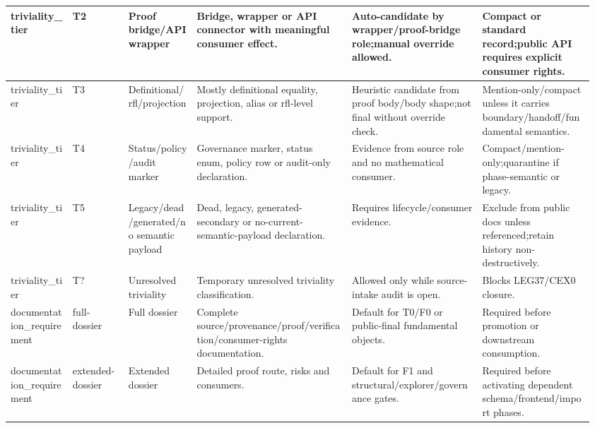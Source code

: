 \begin{longtable}{L{0.105\linewidth} L{0.095\linewidth} L{0.11\linewidth} L{0.255\linewidth} L{0.215\linewidth} L{0.185\linewidth}}
triviality\_tier & T2 & Proof bridge/\allowbreak{}API wrapper & Bridge, wrapper or API connector with meaningful consumer effect. & Auto-candidate by wrapper/\allowbreak{}proof-bridge role;\newline manual override allowed. & Compact or standard record;\newline public API requires explicit consumer rights.\\
\hline
\addlinespace[0.24em]
triviality\_tier & T3 & Definitional/\allowbreak{}rfl/\allowbreak{}projection & Mostly definitional equality, projection, alias or rfl-level support. & Heuristic candidate from proof body/\allowbreak{}body shape;\newline not final without override check. & Mention-only/\allowbreak{}compact unless it carries boundary/\allowbreak{}handoff/\allowbreak{}fundamental semantics.\\
\hline
\addlinespace[0.24em]
triviality\_tier & T4 & Status/\allowbreak{}policy/\allowbreak{}audit marker & Governance marker, status enum, policy row or audit-only declaration. & Evidence from source role and no mathematical consumer. & Compact/\allowbreak{}mention-only;\newline quarantine if phase-semantic or legacy.\\
\hline
\addlinespace[0.24em]
triviality\_tier & T5 & Legacy/\allowbreak{}dead/\allowbreak{}generated/\allowbreak{}no semantic payload & Dead, legacy, generated-secondary or no-current-semantic-payload declaration. & Requires lifecycle/\allowbreak{}consumer evidence. & Exclude from public docs unless referenced;\newline retain history non-destructively.\\
\hline
\addlinespace[0.24em]
triviality\_tier & T? & Unresolved triviality & Temporary unresolved triviality classification. & Allowed only while source-intake audit is open. & Blocks LEG37/\allowbreak{}CEX0 closure.\\
\hline
\addlinespace[0.24em]
documentation\_requirement & full-dossier & Full dossier & Complete source/\allowbreak{}provenance/\allowbreak{}proof/\allowbreak{}verification/\allowbreak{}consumer-rights documentation. & Default for T0/\allowbreak{}F0 or public-final fundamental objects. & Required before promotion or downstream consumption.\\
\hline
\addlinespace[0.24em]
documentation\_requirement & extended-dossier & Extended dossier & Detailed proof route, risks and consumers. & Default for F1 and structural/\allowbreak{}explorer/\allowbreak{}governance gates. & Required before activating dependent schema/\allowbreak{}frontend/\allowbreak{}import phases.\\

\end{longtable}
